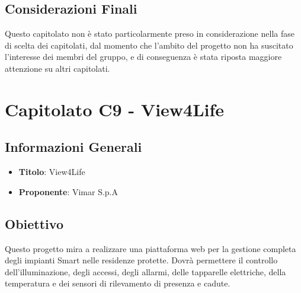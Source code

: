 \documentclass[a4paper,12pt]{article}
\begin{document}
    \subsection{Considerazioni Finali}
    Questo capitolato non è stato particolarmente preso in considerazione nella fase di scelta dei capitolati, dal momento che l’ambito del progetto non ha suscitato l’interesse dei membri del gruppo, e di conseguenza è stata riposta maggiore attenzione su altri capitolati.


    \section{Capitolato C9 - View4Life}
    \subsection{Informazioni Generali}
        \begin{itemize}
            \item \textbf{Titolo}: View4Life
            \item \textbf{Proponente}: Vimar S.p.A
        \end{itemize}
    \subsection{Obiettivo}
    Questo progetto mira a realizzare una piattaforma web per la gestione completa degli impianti Smart nelle residenze protette. Dovrà permettere il controllo dell’illuminazione, degli accessi, degli allarmi, delle tapparelle elettriche, della temperatura e dei sensori di rilevamento di presenza e cadute.
\end{document}
